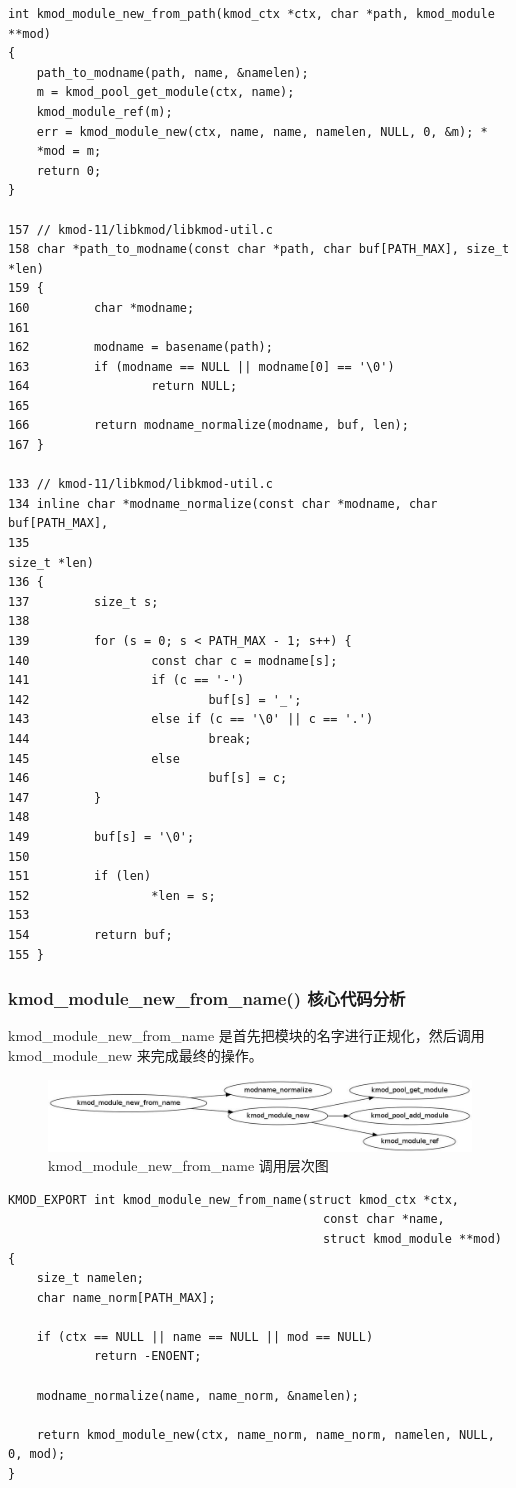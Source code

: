 \documentclass[11pt,a4paper]{article}
\makeatletter
\def\maxwidth{\ifdim\Gin@nat@width>\linewidth\linewidth
\else\Gin@nat@width\fi}
\let\Oldincludegraphics\includegraphics
\renewcommand{\includegraphics}[1]{\Oldincludegraphics[width=\maxwidth]{#1}}
\makeatother
\begin{document}
{\begin{shaded}\begin{verbatim}
int kmod_module_new_from_path(kmod_ctx *ctx, char *path, kmod_module **mod)
{
    path_to_modname(path, name, &namelen);
    m = kmod_pool_get_module(ctx, name);
    kmod_module_ref(m);
    err = kmod_module_new(ctx, name, name, namelen, NULL, 0, &m); *
    *mod = m;
    return 0;
}

157 // kmod-11/libkmod/libkmod-util.c 
158 char *path_to_modname(const char *path, char buf[PATH_MAX], size_t *len)
159 {
160         char *modname;
161 
162         modname = basename(path);
163         if (modname == NULL || modname[0] == '\0')
164                 return NULL;
165 
166         return modname_normalize(modname, buf, len);
167 }

133 // kmod-11/libkmod/libkmod-util.c 
134 inline char *modname_normalize(const char *modname, char buf[PATH_MAX],
135                                                                 size_t *len)
136 {
137         size_t s;
138 
139         for (s = 0; s < PATH_MAX - 1; s++) {
140                 const char c = modname[s];
141                 if (c == '-')
142                         buf[s] = '_';
143                 else if (c == '\0' || c == '.')
144                         break;
145                 else
146                         buf[s] = c;
147         }
148 
149         buf[s] = '\0';
150 
151         if (len)
152                 *len = s;
153 
154         return buf;
155 }
\end{verbatim}\end{shaded}}
\subsubsection{kmod\_module\_new\_from\_name() 核心代码分析}

kmod\_module\_new\_from\_name 是首先把模块的名字进行正规化，然后调用
kmod\_module\_new 来完成最终的操作。

\begin{figure}[htbp]
\centering
\includegraphics{./figures/kmod_module_new_from_name.jpg}
\caption{kmod\_module\_new\_from\_name 调用层次图}
\end{figure}

{\begin{shaded}\begin{verbatim}
KMOD_EXPORT int kmod_module_new_from_name(struct kmod_ctx *ctx,
                                            const char *name,
                                            struct kmod_module **mod)
{
    size_t namelen;
    char name_norm[PATH_MAX];

    if (ctx == NULL || name == NULL || mod == NULL)
            return -ENOENT;

    modname_normalize(name, name_norm, &namelen);

    return kmod_module_new(ctx, name_norm, name_norm, namelen, NULL, 0, mod);
}
\end{verbatim}\end{shaded}}
\end{document}

